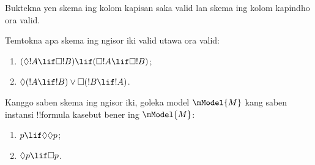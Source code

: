 \documentclass[../../../include/open-logic-section]{subfiles}
\begin{document}
\begin{prob}%
  Buktekna yen skema ing kolom kapisan saka
   valid lan skema ing
  kolom kapindho ora valid.
\end{prob}

\begin{prob}
  Temtokna apa skema ing ngisor iki valid utawa ora valid:
  \begin{enumerate}
  \item $(\Diamond !A \lif \Box !B) \lif (\Box !A \lif \Box
    !B)$;
  \item $\Diamond(!A \lif !B) \lor \Box(!B \lif !A)$.
  \end{enumerate}
\end{prob}

\begin{prob}
  Kanggo saben skema ing ngisor iki, goleka model $\mModel{M}$
  kang saben instansi !!{formula} kasebut bener ing $\mModel{M}$:
  \begin{enumerate}
  \item $p \lif \Diamond\Diamond p$;
  \item $\Diamond p \lif \Box p$.
  \end{enumerate}
\end{prob}
\end{document}
